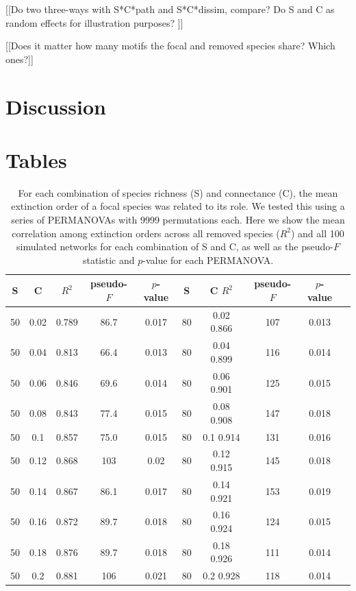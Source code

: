 \documentclass[12pt]{article}
\begin{document}
		[[Do two three-ways with S*C*path and S*C*dissim, compare? Do S and C as random effects for illustration purposes? ]]	

		[[Does it matter how many motifs the focal and removed species share? Which ones?]]

\section*{Discussion}



\section*{Tables}


	\begin{table}[h!]
		\caption{For each combination of species richness (S) and connectance (C), the mean extinction order of a focal species was related to its role. We tested this using a series of PERMANOVAs with 9999 permutations each. Here we show the mean correlation among extinction orders across all removed species ($R^2$) and all 100 simulated networks for each combination of S and C, as well as the pseudo-$F$ statistic and $p$-value for each PERMANOVA.}
		\label{permtable}
		\begin{tabular}{c c | c | c c ||c c | c | c c |}
			S	&	C	&	$R^2$	&	pseudo-$F$	&	$p$-value	&	S	&	C	$R^2$	&	pseudo-$F$	&	$p$-value\\ 
			\hline
			50	&	0.02	&	0.789	&	86.7	&	0.017	&	80	&	0.02	0.866	&	107	&	0.013\\ 
			50	&	0.04	&	0.813	&	66.4	&	0.013	&	80	&	0.04	0.899	&	116	&	0.014\\ 
			50	&	0.06	&	0.846	&	69.6	&	0.014	&	80	&	0.06	0.901	&	125	&	0.015\\ 
			50	&	0.08	&	0.843	&	77.4	&	0.015	&	80	&	0.08	0.908	&	147	&	0.018\\ 
			50	&	0.1	&	0.857	&	75.0	&	0.015	&	80	&	0.1	0.914	&	131	&	0.016\\ 
			50	&	0.12	&	0.868	&	103	&	0.02	&	80	&	0.12	0.915	&	145	&	0.018\\ 
			50	&	0.14	&	0.867	&	86.1	&	0.017	&	80	&	0.14	0.921	&	153	&	0.019\\ 
			50	&	0.16	&	0.872	&	89.7	&	0.018	&	80	&	0.16	0.924	&	124	&	0.015\\ 
			50	&	0.18	&	0.876	&	89.7	&	0.018	&	80	&	0.18	0.926	&	111	&	0.014\\ 
			50	&	0.2	&	0.881	&	106	&	0.021	&	80	&	0.2	0.928	&	118	&	0.014\\ 

\end{tabular}
\end{table}
\end{document}
